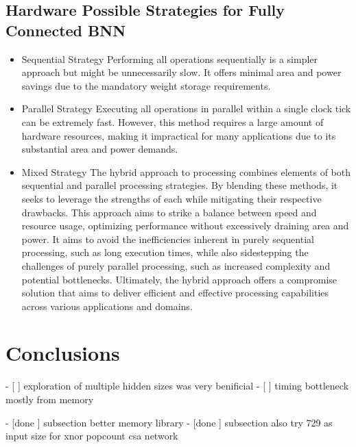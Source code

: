 \documentclass[conference]{IEEEtran}
\newcounter{todocount}
\newcommand{\todo}[1]{
  \stepcounter{todocount}
}
\begin{document}
    \subsection{Hardware Possible Strategies for Fully Connected BNN}
    \begin{itemize}
        \item Sequential Strategy
        Performing all operations sequentially is a simpler approach but might be unnecessarily slow. It offers minimal area and power savings due to the mandatory weight storage requirements.
        \item Parallel Strategy
        Executing all operations in parallel within a single clock tick can be extremely fast. However, this method requires a large amount of hardware resources, making it impractical for many applications due to its substantial area and power demands.
        \item Mixed Strategy
        The hybrid approach to processing combines elements of both sequential and parallel processing strategies. By blending these methods, it seeks to leverage the strengths of each while mitigating their respective drawbacks. This approach aims to strike a balance between speed and resource usage, optimizing performance without excessively draining area and power. It aims to avoid the inefficiencies inherent in purely sequential processing, such as long execution times, while also sidestepping the challenges of purely parallel processing, such as increased complexity and potential bottlenecks. Ultimately, the hybrid approach offers a compromise solution that aims to deliver efficient and effective processing capabilities across various applications and domains.
    \end{itemize}
\section{Conclusions}
\label{sec:conclusions}
	- [ ] exploration of multiple hidden sizes was very benificial
	- [ ] timing bottleneck mostly from memory


\todo{future work}
	- [done ] subsection better memory library
	- [done ] subsection also try 729 as input size for xnor popcount csa network
\end{document}
